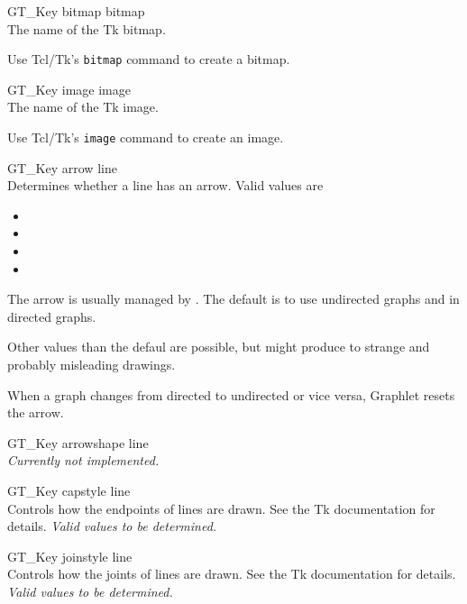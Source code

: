 \documentclass[twoside,fleqn]{report}
\begin{document}
\begin{CAttributes}
  \item[GT\_Key bitmap] \hfill
  {\footnotesize bitmap} \\
  The name of the Tk bitmap.
  \begin{note}
  Use Tcl/Tk's \texttt{bitmap} command to create a bitmap.
  \end{note}
      
  \item[GT\_Key image] \hfill
  {\footnotesize image} \\
  The name of the Tk image.
  \begin{note}
  Use Tcl/Tk's \texttt{image} command to create an image.
  \end{note}
      
  \item[GT\_Key arrow] \hfill
  {\footnotesize line} \\
  Determines whether a line has an arrow. Valid values are
  \begin{itemize}
  \item {}
  \item {}
  \item {}
  \item {} 
  \end{itemize}
  \begin{notes}   
  \item The arrow is usually managed by \Graphlet{}.  The default is 
  to use  undirected graphs and 
   in directed graphs.
  \item Other values than the defaul are possible, but might produce to 
  strange and probably misleading drawings.
  \item When a graph changes from directed to undirected or vice 
  versa, Graphlet resets the arrow.
  \end{notes} 

  \item[GT\_Key arrowshape] \hfill
  {\footnotesize line} \\
  \emph{Currently not implemented.}
      
  \item[GT\_Key capstyle] \hfill
  {\footnotesize line} \\
  Controls how the endpoints of lines are drawn.  See the Tk 
  documentation for details. \emph{Valid values to be determined.}
      
  \item[GT\_Key joinstyle] \hfill
  {\footnotesize line} \\
  Controls how the joints of lines are drawn.  See the Tk 
  documentation for details. \emph{Valid values to be determined.}
      

\end{CAttributes}
\end{document}
